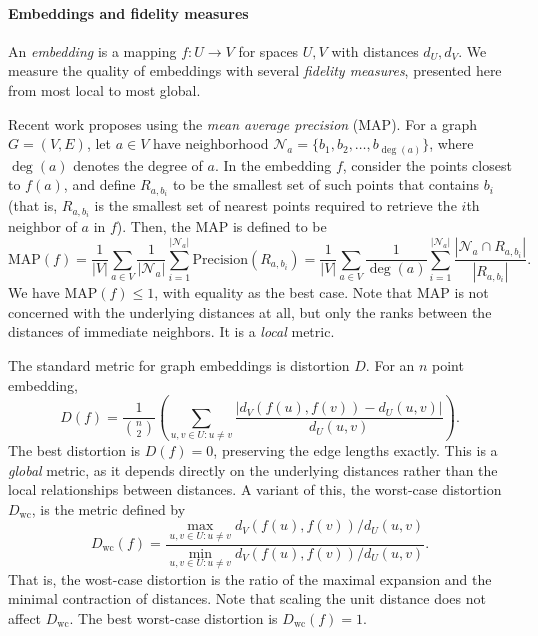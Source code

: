 \paragraph*{Embeddings and fidelity measures} An \emph{embedding} is a mapping $f: U \rightarrow V$ for spaces $U,V$ with distances $d_U, d_V$. We measure the quality of embeddings with several \emph{fidelity measures}, presented here from most local to most global.

Recent work \cite{fb} proposes using the \emph{mean average precision} (MAP). For a graph $G=(V,E)$, let $a \in V$ have neighborhood $\mathcal{N}_a = \{b_1, b_2, \ldots, b_{\operatorname{deg}(a)}\}$, where $\operatorname{deg}(a)$ denotes the degree of $a$. In the embedding $f$, consider the points closest to $f(a)$, and define $R_{a,b_i}$ to be the smallest set of such points that contains $b_i$ (that is, $R_{a,b_i}$ is the smallest set of nearest points required to retrieve the $i$th neighbor of $a$ in $f$). Then, the MAP is defined to be
\[
\text{MAP}(f) 
=
\frac{1}{|V|}\sum_{a \in V} \frac{1}{|\mathcal{N}_a|}\sum_{i=1}^{|\mathcal{N}_a|} \text{Precision}(R_{a,b_i})
=
\frac{1}{|V|}\sum_{a \in V} \frac{1}{\operatorname{deg}(a)}\sum_{i=1}^{|\mathcal{N}_a|} \frac{ \left| \mathcal{N}_a \cap R_{a,b_i} \right| }{\left| R_{a,b_i} \right|}.
\]
We have $\text{MAP}(f) \leq 1$, with equality as the best case. 
Note that MAP is not concerned with the underlying distances at all, but only the ranks between the distances of immediate neighbors. It is a \emph{local} metric.


The standard metric for graph embeddings is distortion $D$. For an $n$ point embedding,
\[D(f) = \frac{1}{\binom{n}{2}} \left(\sum_{u,v \in U:u\neq v} \frac{| d_V(f(u),f(v)) - d_U(u,v)|}{d_U(u,v)}\right).\]
The best distortion is $D(f) = 0$, preserving the edge lengths exactly.
This is a \emph{global} metric, as it depends directly on the underlying distances rather than the local relationships between distances.
A variant of this, the worst-case distortion $D_{\mathrm{wc}}$, is the metric defined by
\[D_{\mathrm{wc}}(f) = \frac{\max_{u,v \in U: u \neq v}d_V(f(u),f(v))/d_U(u,v)}{\min_{u,v \in U : u\neq v} d_V(f(u),f(v))/d_U(u,v)} .\]
That is, the wost-case distortion is the ratio of the maximal expansion and the minimal contraction of distances. Note that scaling the unit distance does not affect $D_{\mathrm{wc}}$. The best worst-case distortion is $D_{\mathrm{wc}}(f) = 1$. 

